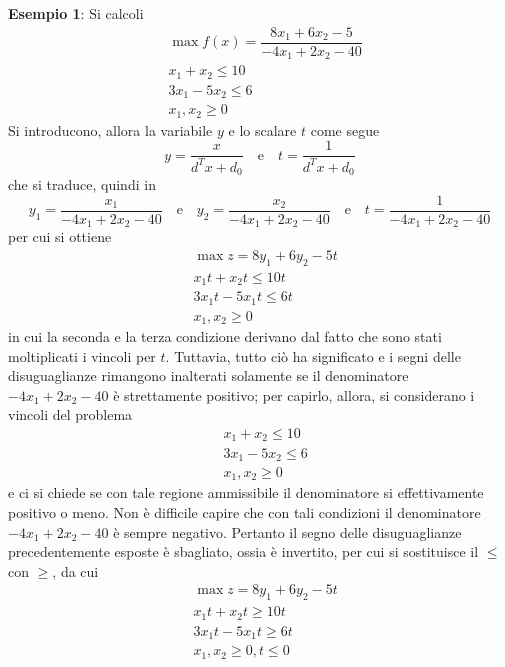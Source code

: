\documentclass[a4paper]{extarticle}
\begin{document}
\vspace{2em}
\noindent
\textbf{Esempio 1}: Si calcoli
\begin{align*}
    &\max f(x) = \dfrac{8x_1+6x_2-5}{-4x_1+2x_2-40}\\
    &x_1+x_2 \leq 10\\
    &3x_1-5x_2 \leq 6\\
    &x_1,x_2 \geq 0
\end{align*}
Si introducono, allora la variabile $y$ e lo scalare $t$ come segue
\[y=\dfrac{x}{d^T x + d_0} \hspace{1em} \text{e} \hspace{1em} t=\dfrac{1}{d^T x + d_0}\]
che si traduce, quindi in
\[y_1 = \dfrac{x_1}{-4x_1 + 2x_2 - 40} \hspace{1em} \text{e} \hspace{1em} y_2=\dfrac{x_2}{-4x_1 +2x_2 - 40} \hspace{1em} \text{e} \hspace{1em} t=\dfrac{1}{-4x_1+2x_2-40}\]
per cui si ottiene
\begin{align*}
    &\max z = 8y_1 + 6y_2 - 5t\\
    &x_1 t + x_2 t \leq 10 t\\
    &3x_1t-5x_1 t \leq 6t\\
    &x_1,x_2 \geq 0
\end{align*}
in cui la seconda e la terza condizione derivano dal fatto che sono stati moltiplicati i vincoli per $t$. Tuttavia, tutto ciò ha significato e i segni delle disuguaglianze rimangono inalterati solamente se il denominatore $-4x_1+2x_2-40$ è strettamente positivo; per capirlo, allora, si considerano i vincoli del problema
\begin{align*}
    &x_1+x_2 \leq 10\\
    &3x_1-5x_2 \leq 6\\
    &x_1,x_2 \geq 0
\end{align*}
e ci si chiede se con tale regione ammissibile il denominatore si effettivamente positivo o meno. Non è difficile capire che con tali condizioni il denominatore $-4x_1+2x_2-40$ è sempre negativo. Pertanto il segno delle disuguaglianze precedentemente esposte è sbagliato, ossia è invertito, per cui si sostituisce il $\leq$ con $\geq$, da cui
\begin{align*}
    &\max z = 8y_1 + 6y_2 - 5t\\
    &x_1 t + x_2 t \geq 10 t\\
    &3x_1t-5x_1 t \geq 6t\\
    &x_1,x_2 \geq 0, t \leq 0
\end{align*}
\end{document}
